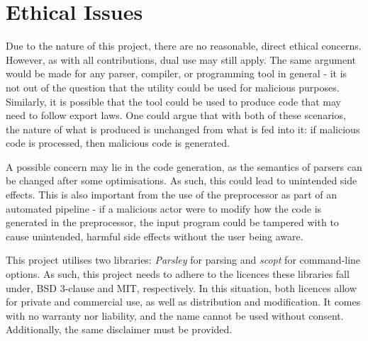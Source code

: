 \section{Ethical Issues}
\label{sec:ethics}

Due to the nature of this project, there are no reasonable, direct ethical concerns.
However, as with all contributions, dual use may still apply.
The same argument would be made for any parser, compiler, or programming tool in general - it is not out of the question that the utility could be used for malicious purposes.
Similarly, it is possible that the tool could be used to produce code that may need to follow export laws.
One could argue that with both of these scenarios, the nature of what is produced is unchanged from what is fed into it: if malicious code is processed, then malicious code is generated.

A possible concern may lie in the code generation, as the semantics of parsers can be changed after some optimisations.
As such, this could lead to unintended side effects.
This is also important from the use of the preprocessor as part of an automated pipeline - if a malicious actor were to modify how the code is generated in the preprocessor, the input program could be tampered with to cause unintended, harmful side effects without the user being aware.

This project utilises two libraries: \textit{Parsley} \cite{willis18} for parsing and \textit{scopt} \cite{scopt} for command-line options.
As such, this project needs to adhere to the licences these libraries fall under, BSD 3-clause and MIT, respectively.
In this situation, both licences allow for private and commercial use, as well as distribution and modification.
It comes with no warranty nor liability, and the name cannot be used without consent.
Additionally, the same disclaimer must be provided.
